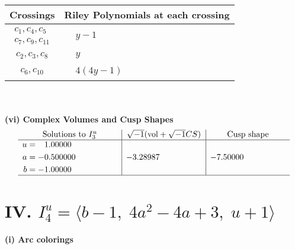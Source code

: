 \documentclass[1p]{elsarticle_modified}
\theoremstyle{definition}
\newcommand{\I}{\sqrt{-1}}
\begin{document}
\begin{tabular}{m{50pt}|m{274pt}}
Crossings & \hspace{64pt}Riley Polynomials at each crossing \\
\hline $$\begin{aligned}c_{1},c_{4},c_{5}\\c_{7},c_{9},c_{11}\end{aligned}$$&$\begin{aligned}
&y-1
\end{aligned}$\\
\hline $$\begin{aligned}c_{2},c_{3},c_{8}\end{aligned}$$&$\begin{aligned}
&y
\end{aligned}$\\
\hline $$\begin{aligned}c_{6},c_{10}\end{aligned}$$&$\begin{aligned}
&4(4 y-1)
\end{aligned}$\\
\hline
\end{tabular}\\~\\
\newpage\flushleft \textbf{(vi) Complex Volumes and Cusp Shapes}
$$\begin{array}{c|c|c}  
\text{Solutions to }I^u_{3}& \I (\text{vol} + \sqrt{-1}CS) & \text{Cusp shape}\\
 \hline 
\begin{aligned}
u &= \phantom{-}1.00000\phantom{ +0.000000I} \\
a &= -0.500000\phantom{ +0.000000I} \\
b &= -1.00000\phantom{ +0.000000I}\end{aligned}
 & -3.28987\phantom{ +0.000000I} & -7.50000\phantom{ +0.000000I}\\
 \hline 
 \end{array}$$\newpage\newpage\renewcommand{\arraystretch}{1}
\centering \section*{IV. $I^u_{4}= \langle b-1,\;4 a^2-4 a+3,\;u+1 \rangle$}
\flushleft \textbf{(i) Arc colorings}\\
\end{document}
